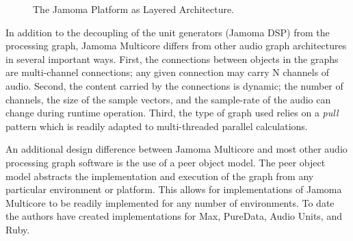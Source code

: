 \documentclass[twoside,a4paper]{article}
\begin{document}
\begin{figure}[htbp]
\centerline{}
\caption{The Jamoma Platform as Layered Architecture.}
\label{fig:layers}
\end{figure}


In addition to the decoupling of the unit generators (Jamoma DSP) from the processing graph, Jamoma Multicore differs from other audio graph architectures in several important ways. %
 First, the connections between objects in the graphs are multi-channel connections; any given connection may carry N channels of audio.  Second, the content carried by the connections is dynamic; the number of channels, the size of the sample vectors, and the sample-rate of the audio can change during runtime operation.  Third, the type of graph used relies on a \emph{pull} pattern which is readily adapted to multi-threaded parallel calculations.

An additional design difference between Jamoma Multicore and most other audio processing graph software is the use of a peer object model.  The peer object model abstracts the implementation and execution of the graph from any particular environment or platform.  This allows for implementations of Jamoma Multicore to be readily implemented for any number of environments.  To date the authors have created implementations for Max, PureData, Audio Units, and Ruby.
\end{document}
